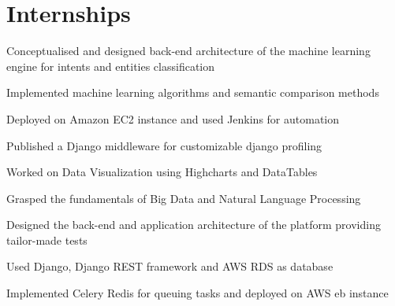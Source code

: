 \documentclass[]{deedy-resume-openfont}
\begin{document}
\hfill
\begin{minipage}[t]{0.66\textwidth} 


\section{Internships}

\vspace{\topsep} %
\begin{tightemize}
\item Conceptualised and designed back-end architecture of the machine learning engine for intents and entities classification
\item Implemented machine learning algorithms and semantic comparison methods
\item Deployed on Amazon EC2 instance and used Jenkins for automation
\item Published a Django middleware for customizable django profiling
\end{tightemize}
\sectionsep

\begin{tightemize}
\item Worked on Data Visualization using Highcharts and DataTables
\item Grasped the fundamentals of Big Data and Natural Language Processing
\end{tightemize}
\sectionsep

\begin{tightemize}
\item Designed the back-end and application architecture of the platform providing tailor-made tests
\item Used Django, Django REST framework and AWS RDS as database 
\item Implemented Celery Redis for queuing tasks and deployed on AWS eb instance 
\end{tightemize}
\sectionsep



\end{minipage}
\end{document}
